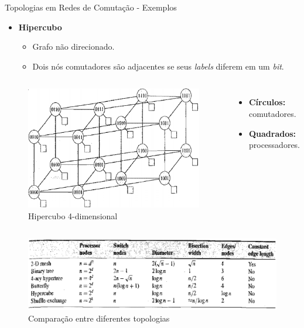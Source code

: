 \begin{frame}{Topologias em Redes de Comutação - Exemplos}
	\begin{itemize}
		\item \textbf{Hipercubo}
		\bigskip
		\begin{itemize}
			\item Grafo não direcionado.
			\medskip
			\item Dois nós comutadores são adjacentes se seus \textit{labels} diferem em um \textit{bit}.
		\end{itemize}
	\end{itemize}
	\begin{columns}
		\hfill
		\begin{figure}[H]
			\centering
			\includegraphics[width=.73\linewidth]{img/redes_de_interconexao/Hyper.png}
			\caption[Hypercubo 4-dimensional]{Hipercubo 4-dimensional}
			\label{fig:hyper}
		\end{figure}
		\begin{itemize}
			\item \textbf{Círculos:} comutadores.
			\smallskip
			\item \textbf{Quadrados:} processadores.
		\end{itemize}
	\end{columns}
\end{frame}

\begin{frame}
\begin{center}
\begin{figure}[H]
\centering
\includegraphics[width=1\linewidth]{img/redes_de_interconexao/compara}
\caption[Comparação entre diferentes topologias]{Comparação entre diferentes topologias}
\label{fig:compara}
\end{figure}
\end{center}

\end{frame}

